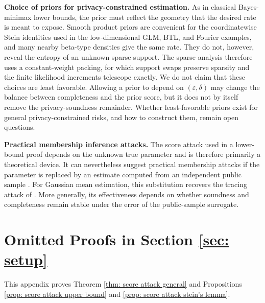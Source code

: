 \documentclass[letterpaper,12pt]{article}
\numberwithin{equation}{section}
\theoremstyle{plain}
\numberwithin{Theorem}{section}
\numberwithin{proposition}{section}
\numberwithin{Lemma}{section}
{
	\theoremstyle{definition}
	\newtheorem{Definition}{Definition}
	\newtheorem{example}{Example}
	\numberwithin{example}{section}
	\newtheorem{fact}{Fact}
	\numberwithin{fact}{section}
	\newtheorem{remark}{Remark}
}
\newcommand{\1}{\mathbbm{1}}
\begin{document}
\textbf{Choice of priors for privacy-constrained estimation.} As in classical Bayes-minimax lower bounds, the prior must reflect the geometry that the desired rate is meant to expose. Smooth product priors are convenient for the coordinatewise Stein identities used in the low-dimensional GLM, BTL, and Fourier examples, and many nearby beta-type densities give the same rate. They do not, however, reveal the entropy of an unknown sparse support. The sparse analysis therefore uses a constant-weight packing, for which support swaps preserve sparsity and the finite likelihood increments telescope exactly. We do not claim that these choices are least favorable. Allowing a prior to depend on $(\varepsilon,\delta)$ may change the balance between completeness and the prior score, but it does not by itself remove the privacy-soundness remainder. Whether least-favorable priors exist for general privacy-constrained risks, and how to construct them, remain open questions.

\textbf{Practical membership inference attacks.} The score attack used in a lower-bound proof depends on the unknown true parameter and is therefore primarily a theoretical device. It can nevertheless suggest practical membership attacks if the parameter is replaced by an estimate computed from an independent public sample \cite{shokri2017membership}. For Gaussian mean estimation, this substitution recovers the tracing attack of \cite{homer2008resolving}. More generally, its effectiveness depends on whether soundness and completeness remain stable under the error of the public-sample surrogate.


\section{Omitted Proofs in Section \ref{sec: setup}} \label{sec: proofs}

This appendix proves Theorem \ref{thm: score attack general} and Propositions \ref{prop: score attack upper bound} and \ref{prop: score attack stein's lemma}.
\end{document}
